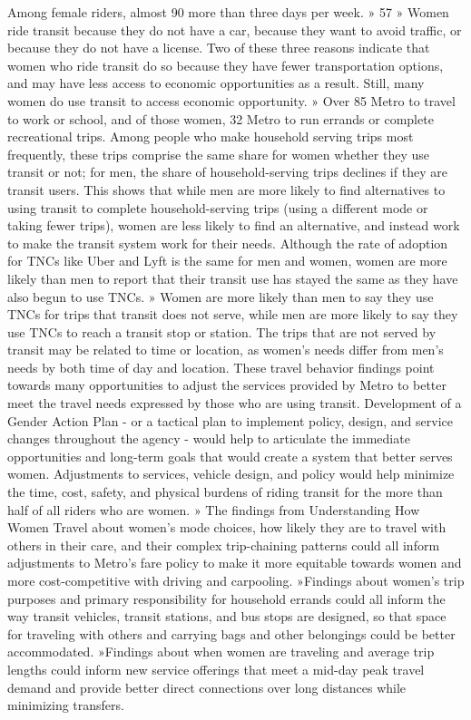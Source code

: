 \documentclass[
  12pt,
]{article}
\begin{document}
\begin{flushleft}
Among female riders, almost 90%
more than three days per week.
» 57%
» Women ride transit because they do not have a
car, because they want to avoid traffic, or because
they do not have a license. Two of these three
reasons indicate that women who ride transit
do so because they have fewer
transportation options, and may
have less access to economic
opportunities as a result.
Still, many women do use transit
to access economic opportunity.
» Over 85%
Metro to travel to work or school,
and of those women, 32%
Metro to run errands or complete
recreational trips.
Among people who make household
serving trips most frequently,
these trips comprise the same
share for women whether they use
transit or not; for men, the share of
household-serving trips declines if
they are transit users. This shows
that while men are more likely to
find alternatives to using transit to
complete household-serving trips
(using a different mode or taking
fewer trips), women are less likely
to find an alternative, and instead
work to make the transit system work for their needs.
Although the rate of adoption for TNCs like Uber and
Lyft is the same for men and women, women are more
likely than men to report that their transit use has
stayed the same as they have also begun to use TNCs.
» Women are more likely than men to say they use
TNCs for trips that transit does not serve, while
men are more likely to say they use TNCs to reach a
transit stop or station. The trips that are not served
by transit may be related to time or location, as
women’s needs differ from men’s needs by both
time of day and location.
These travel behavior findings point towards many
opportunities to adjust the services provided by Metro
to better meet the travel needs expressed by those
who are using transit. Development of a Gender Action
Plan - or a tactical plan to implement policy, design,
and service changes throughout the agency - would
help to articulate the immediate opportunities and
long-term goals that would create a system that
better serves women. Adjustments to services, vehicle
design, and policy would help minimize the time,
cost, safety, and physical burdens of riding transit
for the more than half of all riders who are women.
» The findings from Understanding
How Women Travel about women’s
mode choices, how likely they are to
travel with others in their care, and
their complex trip-chaining patterns
could all inform adjustments to
Metro’s fare policy to make it more
equitable towards women and more
cost-competitive with driving and
carpooling.
»Findings about women’s trip
purposes and primary responsibility
for household errands could all
inform the way transit vehicles,
transit stations, and bus stops are
designed, so that space for traveling
with others and carrying bags and
other belongings could be better
accommodated.
»Findings about when women are
traveling and average trip lengths
could inform new service offerings
that meet a mid-day peak travel
demand and provide better direct
connections over long distances while
minimizing transfers. 



\end{flushleft}
\end{document}
